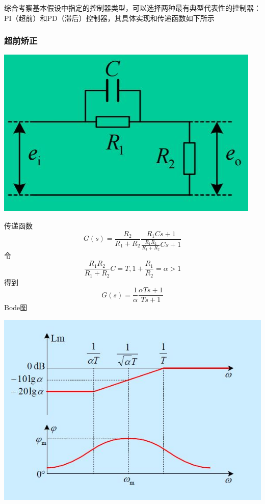 \documentclass[UTF8,a4paper]{ctexart}
\begin{document}
综合考察基本假设中指定的控制器类型，可以选择两种最有典型代表性的控制器：PI（超前）和PD（滞后）控制器，其具体实现和传递函数如下所示
\begin{multicols}{2}
\subsubsection{超前矫正}
\begin{figurehere}
\centering
\includegraphics[width=\columnwidth]{pd.jpg}
\end{figurehere}
传递函数
\begin{equation}
G(s)=\frac{R_2}{R_1+R_2}\frac{R_1Cs+1}{\frac{R_1R_2}{R_1+R_2}Cs+1}
\end{equation}
令
$$\frac{R_1R_2}{R_1+R_2}C=T,1+\frac{R_1}{R_2}=\alpha>1$$
得到
\begin{equation}
G(s)=\frac{1}{\alpha}\frac{\alpha Ts+1}{Ts+1}
\end{equation}
Bode图

\begin{figurehere}
\centering
\includegraphics[width=\columnwidth]{bodepd.jpg}
\end{figurehere}

\end{multicols}
\end{document}
